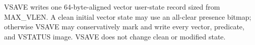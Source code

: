 VSAVE writes one 64-byte-aligned vector user-state record sized from MAX\_VLEN. A clean initial vector state may use an all-clear presence bitmap; otherwise VSAVE may conservatively mark and write every vector, predicate, and VSTATUS image. VSAVE does not change clean or modified state.
